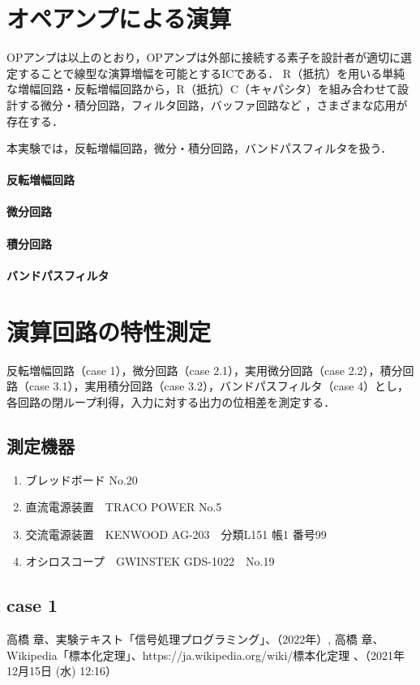 \documentclass[dvipdfmx,titlepage,a4j]{jsarticle}  %
\begin{document}
\section{オペアンプによる演算}
OPアンプは以上のとおり，OPアンプは外部に接続する素子を設計者が適切に選定することで線型な演算増幅を可能とするICである．
R（抵抗）を用いる単純な増幅回路・反転増幅回路から，R（抵抗）C（キャパシタ）を組み合わせて設計する微分・積分回路，フィルタ回路，バッファ回路など
，さまざまな応用が存在する．

本実験では，反転増幅回路，微分・積分回路，バンドパスフィルタを扱う．

\paragraph{反転増幅回路\\}

\paragraph{微分回路\\}

\paragraph{積分回路\\}

\paragraph{バンドパスフィルタ\\}

\section{演算回路の特性測定}
反転増幅回路（case 1），微分回路（case 2.1），実用微分回路（case 2.2），積分回路（case 3.1），実用積分回路（case 3.2），バンドパスフィルタ（case 4）とし，
各回路の閉ループ利得，入力に対する出力の位相差を測定する．
\subsection{測定機器}
\begin{enumerate}
  \item ブレッドボード No.20
  \item 直流電源装置　TRACO POWER No.5
  \item 交流電源装置　KENWOOD AG-203　分類L151 帳1 番号99
  \item オシロスコープ　GWINSTEK GDS-1022　No.19
\end{enumerate}

\subsection{case 1}


\begin{thebibliography}{99}
   高橋 章、実験テキスト「信号処理プログラミング」、（2022年）,
   高橋 章、Wikipedia「標本化定理」、{https://ja.wikipedia.org/wiki/標本化定理} 、（2021年12月15日 (水) 12:16）
\end{thebibliography}
\end{document}
